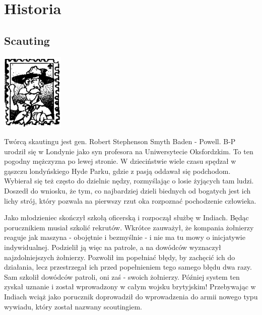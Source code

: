 \chapter{Historia}
\section{Scauting}
\begin{floatingfigure}[r]{3cm}
\centering
  \includegraphics[width=3cm]{grafiki/bp.png}
\end{floatingfigure}
Twórcą skautingu jest gen. Robert Stephenson Smyth Baden - Powell. 
B-P urodził się w Londynie jako syn profesora na Uniwersytecie Oksfordzkim. 
To ten pogodny mężczyzna po lewej stronie. 
W dzieciństwie wiele czasu spędzał w gąszczu londyńskiego Hyde Parku, gdzie z pasją oddawał się podchodom. 
Wybierał się też często do dzielnic nędzy, rozmyślając o losie żyjących tam ludzi. 
Doszedł do wniosku, że tym, co najbardziej dzieli biednych od bogatych jest ich lichy strój, który pozwala na pierwszy rzut oka rozpoznać pochodzenie człowieka.

Jako młodzieniec skończył szkołą oficerską i rozpoczął służbę w Indiach. Będąc porucznikiem musiał szkolić rekrutów. 
Wkrótce zauważył, że kompania żołnierzy reaguje jak maszyna - obojętnie i bezmyślnie - i nie ma tu mowy o inicjatywie indywidualnej. 
Podzielił ją więc na patrole, a na dowódców wyznaczył najzdolniejszych żołnierzy. 
Pozwolił im popełniać błędy, by zachęcić ich do działania, lecz przestrzegał ich przed popełnieniem tego samego błędu dwa razy. Sam szkolił dowódców patroli, oni zaś - swoich żołnierzy. 
Później system ten zyskał uznanie i został wprowadzony w całym wojsku brytyjskim! 
Przebywając w Indiach wciąż jako porucznik doprowadził do wprowadzenia do armii nowego typu wywiadu, który został nazwany scoutingiem.

